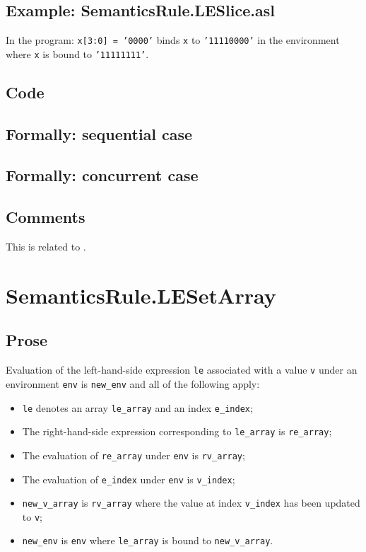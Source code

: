 \documentclass{book}
\begin{document}
   \subsection{Example: SemanticsRule.LESlice.asl}
   In the program:
   \texttt{x[3:0] = '0000'} binds \texttt{x} to \texttt{'11110000'} in the environment where \texttt{x} is bound to \texttt{'11111111'}.

  \subsection{Code}

\begin{emptyformal}
  \subsection{Formally: sequential case}

  \subsection{Formally: concurrent case}
\end{emptyformal}

\subsection{Comments}
  This is related to .

\section{SemanticsRule.LESetArray \label{sec:SemanticsRule.LESetArray}}

    \subsection{Prose}
    Evaluation of the left-hand-side expression \texttt{le} associated with a
value \texttt{v} under an environment \texttt{env} is \texttt{new\_env} and all
of the following apply:
    \begin{itemize}
    \item \texttt{le} denotes an array \texttt{le\_array} and an index \texttt{e\_index};
    \item The right-hand-side expression corresponding to \texttt{le\_array} is \texttt{re\_array};
    \item The evaluation of \texttt{re\_array} under \texttt{env} is \texttt{rv\_array};
    \item The evaluation of \texttt{e\_index} under \texttt{env} is \texttt{v\_index};
    \item \texttt{new\_v\_array} is \texttt{rv\_array} where the value at index \texttt{v\_index} has been
      updated to \texttt{v};
    \item \texttt{new\_env} is \texttt{env} where \texttt{le\_array} is bound to
      \texttt{new\_v\_array}.
    \end{itemize}
\end{document}
